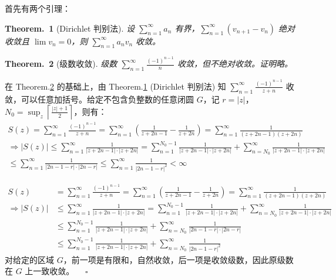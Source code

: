 \documentclass[UTF8]{report}
\theoremstyle{MyLineTheoremStyle} %
\newtheorem{LineTheorem}{Theorem.\,}
\theoremstyle{MyBlockTheoremStyle} %
\theoremstyle{MySubsubsectionStyle} %
\begin{document}
\noindent 首先有两个引理：

\begin{LineTheorem}[Dirichlet 判别法]\label{Dirichlet 判别法}
    设 $\sum_{n=1}^{\infty} a_n $ 有界，$\sum_{n=1}^{\infty} \left(v_{n+1} - v_{n}\right)$ 绝对收敛且 $\lim v_n = 0$，则 $\sum_{n=1}^{\infty} a_n v_n$ 收敛。
\end{LineTheorem}
\begin{LineTheorem}[级数收敛]\label{级数收敛}
    级数 $\sum_{n=1}^{\infty} \frac{(-1)^{n-1}}{n}$ 收敛，但不绝对收敛。证明略。
\end{LineTheorem}

\noindent 在 Theorem.\ref{级数收敛} 的基础上，由 Theorem.\ref{Dirichlet 判别法} (Dirichlet 判别法) 知 $\sum_{n=1}^{\infty} \frac{(-1)^{n-1}}{z + n}$ 收敛，可以任意加括号。给定不包含负整数的任意闭圆 $G$，记 $r = \left| z \right| $，$N_0 = \sup_z \left \lceil \frac{| z | + 1}{2}  \right \rceil $，则有：
\begin{gather}
S(z) 
= \sum_{n=1}^{\infty} \frac{(-1)^{n-1}}{z + n}
= \sum_{n=1}^{\infty} \left( \frac{1}{z+ 2n -1} - \frac{1}{z + 2n } \right)
= \sum_{n=1}^{\infty} \frac{1}{ (z + 2n -1)(z + 2n) } 
\\
\Longrightarrow  
\left| S(z) \right| 
\leqslant \sum_{n=1}^{\infty} \frac{1}{\left| z + 2n -1 \right|  \cdot \left| z + 2n \right| } 
= \sum_{n=1}^{N_0 - 1} \frac{1}{\left| z + 2n -1 \right|  \cdot \left| z + 2n \right| }  + \sum_{n=N_0}^{\infty} \frac{1}{\left| z + 2n -1 \right|  \cdot \left| z + 2n \right| } 
\\
\leqslant \sum_{n=1}^{\infty} \frac{1}{\left| 2n - 1 -r \right| \cdot \left| 2n - r \right| }
\leqslant \sum_{n=1}^{\infty} \frac{1}{\left| 2n - 1 -r \right|^2} < \infty
\end{gather}

\begin{align}
S(z) 
&= \sum_{n=1}^{\infty} \frac{(-1)^{n-1}}{z + n}
= \sum_{n=1}^{\infty} \left( \frac{1}{z+ 2n -1} - \frac{1}{z + 2n } \right)
= \sum_{n=1}^{\infty} \frac{1}{ (z + 2n -1)(z + 2n) } 
\\
\Longrightarrow  
\left| S(z) \right| 
&\leqslant \sum_{n=1}^{\infty} \frac{1}{\left| z + 2n -1 \right|  \cdot \left| z + 2n \right| } 
= \sum_{n=1}^{N_0 - 1} \frac{1}{\left| z + 2n -1 \right|  \cdot \left| z + 2n \right| }  + \sum_{n=N_0}^{\infty} \frac{1}{\left| z + 2n -1 \right|  \cdot \left| z + 2n \right| } 
\\ 
& \leqslant \sum_{n=1}^{N_0 - 1} \frac{1}{\left| z + 2n -1 \right|  \cdot \left| z + 2n \right| }  + \sum_{n=N_0}^{\infty} \frac{1}{\left|2n -1 - r \right|  \cdot \left|2n - r\right| } 
\\
& \leqslant \sum_{n=1}^{N_0 - 1} \frac{1}{\left| z + 2n -1 \right|  \cdot \left| z + 2n \right| }  + \sum_{n=N_0}^{\infty} \frac{1}{\left|2n -1 - r \right|^2 } 
\end{align}
对给定的区域 $G$，前一项是有限和，自然收敛，后一项是收敛级数，因此原级数在 $G$ 上一致收敛。 $\quad\square$
\end{document}
